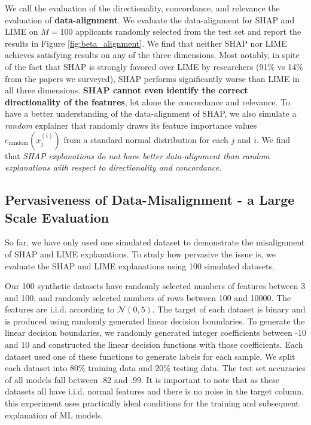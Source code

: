 \documentclass[mnsc,blindrev]{informs3}
\begin{document}
  We call the evaluation of the directionality, concordance, and relevance the evaluation of \textbf{data-alignment}. We evaluate the data-alignment
 for SHAP and LIME on $M=100$ applicants randomly selected from the test set and report the results in Figure \ref{fig:beta_alignment}. 
 We find that neither SHAP nor LIME achieves satisfying results on any of the three dimensions. Most notably, in spite of the fact that SHAP is strongly favored over LIME by researchers (91\% vs 14\% from the papers we surveyed), SHAP performs significantly worse than LIME in all three dimensions. \textbf{SHAP cannot even identify the correct directionality of the features}, let alone the concordance and relevance. To have a better understanding of the data-alignment of SHAP, we also simulate a \emph{random} explainer that randomly draws its feature importance values $e_\text{random}(x^{(i)}_j)$ from a standard normal distribution for each $j$ and $i$. We find that \emph{SHAP explanations do not have better data-alignment than random explanations  with respect to directionality and concordance.}         


\subsection{Pervasiveness of Data-Misalignment - a Large Scale Evaluation}
    \label{sec:pervasive}
    So far, we have only used one simulated dataset to demonstrate the misalignment of SHAP and LIME explanations. To study how pervasive the issue is, %
    we evaluate the SHAP and LIME explanations using 100 simulated datasets.
    
    Our 100 synthetic datasets have randomly selected numbers of features between 3 and 100, and randomly selected numbers of rows between 100 and 10000. The features are i.i.d. according to $\mathcal{N}(0,5)$. The target of each dataset is binary and is produced using randomly generated linear decision boundaries. To generate the linear decision boundaries, we randomly generated integer coefficients between -10 and 10 and  constructed the linear decision functions with those coefficients. Each dataset used one of these functions to generate labels for each sample.  %
    We split each dataset into 80\% training data and 20\% testing data.  The test set accuracies of all models fall between $.82$ and $.99$. It is important to note that as these datasets all have i.i.d. normal features and there is no noise in the target column, this experiment uses practically ideal conditions for the training and subsequent explanation of ML models.
\end{document}
